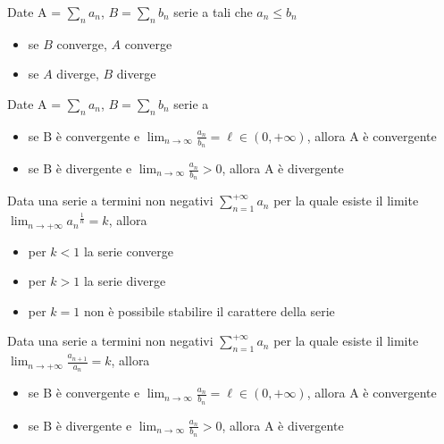 \documentclass[letterpaper,10pt,english]{jupyterBook}
\begin{document}
\sphinxAtStartPar
{} Date A = \(\sum_n a_n\), \(B =\sum_n b_n\) serie a  tali che \(a_n \le b_n\)
\begin{itemize}
\item {} 
\sphinxAtStartPar
se \(B\) converge, \(A\) converge

\item {} 
\sphinxAtStartPar
se \(A\)  diverge, \(B\)  diverge

\end{itemize}

\sphinxAtStartPar
{} Date A = \(\sum_n a_n\), \(B =\sum_n b_n\) serie a 
\begin{itemize}
\item {} 
\sphinxAtStartPar
se B è convergente e \(\lim_{n \rightarrow \infty} \frac{a_n}{b_n} = \ell \in (0, +\infty)\), allora A è convergente

\item {} 
\sphinxAtStartPar
se B è  divergente e \(\lim_{n \rightarrow \infty} \frac{a_n}{b_n} > 0\), allora A è  divergente

\end{itemize}

\sphinxAtStartPar
{}

\sphinxAtStartPar
{} Data una serie a termini non negativi \(\sum_{n=1}^{+\infty} a_n\) per la quale esiste il limite \(\lim_{n \rightarrow +\infty} {a_n}^{\frac{1}{n}} = k\), allora
\begin{itemize}
\item {} 
\sphinxAtStartPar
per \(k < 1\) la serie converge

\item {} 
\sphinxAtStartPar
per \(k > 1\) la serie diverge

\item {} 
\sphinxAtStartPar
per \(k = 1\) non è possibile stabilire il carattere della serie

\end{itemize}

\sphinxAtStartPar
{} Data una serie a termini non negativi \(\sum_{n=1}^{+\infty} a_n\) per la quale esiste il limite \(\lim_{n \rightarrow +\infty} \frac{a_{n+1}}{a_n} = k\), allora
\begin{itemize}
\item {} 
\sphinxAtStartPar
se B è convergente e \(\lim_{n \rightarrow \infty} \frac{a_n}{b_n} = \ell \in (0, +\infty)\), allora A è convergente

\item {} 
\sphinxAtStartPar
se B è  divergente e \(\lim_{n \rightarrow \infty} \frac{a_n}{b_n} > 0\), allora A è  divergente

\end{itemize}
\end{document}
